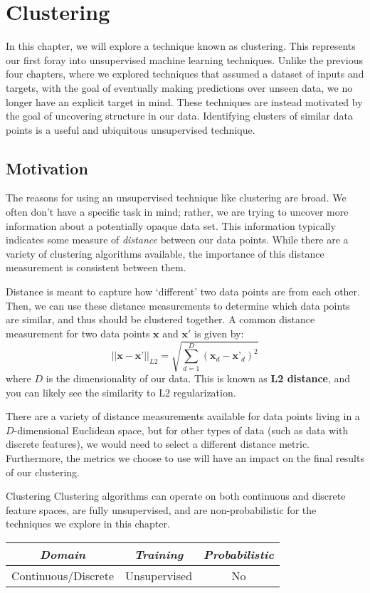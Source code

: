 \chapter{Clustering}
In this chapter, we will explore a technique known as clustering. This represents our first foray into unsupervised machine learning techniques. Unlike the previous four chapters, where we explored techniques that assumed a dataset of inputs and targets, with the goal of eventually making predictions over unseen data, we no longer have an explicit target in mind. These techniques are instead motivated by the goal of uncovering structure in our data. Identifying clusters of similar data points is a useful and ubiquitous unsupervised technique.

\section{Motivation}
The reasons for using an unsupervised technique like clustering are broad. We often don't have a specific task in mind; rather, we are trying to uncover more information about a potentially opaque data set. This information typically indicates some measure of \textit{distance} between our data points. While there are a variety of clustering algorithms available, the importance of this distance measurement is consistent between them.

Distance is meant to capture how `different' two data points are from each other. Then, we can use these distance measurements to determine which data points are similar, and thus should be clustered together. A common distance measurement for two data points $\textbf{x}$ and $\textbf{x}'$ is given by:
\begin{equation} \label{l2-distance}
	|| \textbf{x} - \textbf{x'} ||_{L2} = \sqrt{\sum_{d=1}^{D} (\textbf{x}_{d} - \textbf{x'}_{d})^{2}}
\end{equation}
where $D$ is the dimensionality of our data. This is known as \textbf{L2 distance}, and you can likely see the similarity to L2 regularization.

There are a variety of distance measurements available for data points living in a $D$-dimensional Euclidean space, but for other types of data (such as data with discrete features), we would need to select a different distance metric. Furthermore, the metrics we choose to use will have an impact on the final results of our clustering.

\begin{mlcube}{Clustering}
Clustering algorithms can operate on both continuous and discrete feature spaces, are fully unsupervised, and are non-probabilistic for the techniques we explore in this chapter.
\begin{center}
    \begin{tabular}{c|c|c}
    \textit{\textbf{Domain}} & \textit{\textbf{Training}} & \textit{\textbf{Probabilistic}} \\
    \hline
    Continuous/Discrete & Unsupervised & No \\
    \end{tabular}
\end{center}
\end{mlcube}

